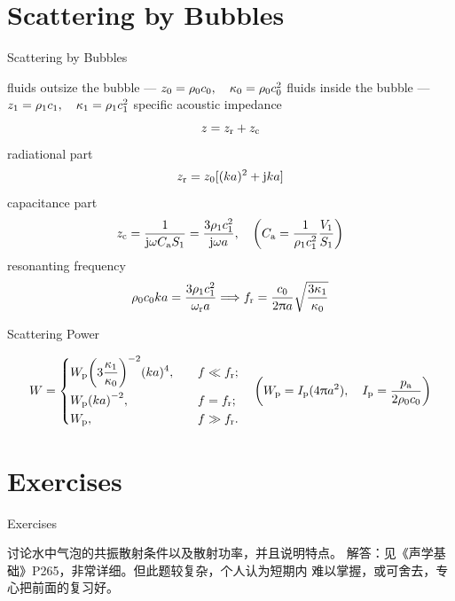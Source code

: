 \documentclass[9pt,mathserif]{beamer}
\let\emph\relax %
\begin{document}
\section{Scattering by Bubbles}
\begin{frame}{Scattering by Bubbles}
	\begin{outline}
		\1 fluids outsize the bubble --- $z_0 = \rho_0 c_0\qc \kappa_0 = 
		\rho_0c_0^2$
		\1 fluids inside the bubble --- $z_1 = \rho_1 c_1\qc \kappa_1 = 
		\rho_1c_1^2$
		\1 specific acoustic impedance
		$$z = z_\text{r} + z_\text{c}$$
		\1 radiational part
		$$z_\text{r} = z_0[(ka)^2+\mathrm{j} ka]$$
		\1 capacitance part
		$$z\st{c} = \frac{1}{\mj \omega C\st{a} S_1} = \frac{3\rho_1c_1^2}{
		\mj \omega a}\qc \qty(C\st{a} = \frac{1}{\rho_1c_1^2} \frac{V_1}{
		S_1})$$
		\1 resonanting frequency
		$$\rho_0c_0 k a = \frac{3\rho_1c_1^2}{\omega_\text{r} a}
		\Longrightarrow
		f_\text{r} = \frac{c_0}{2\uppi a}\sqrt{\frac{3\kappa_1}{\kappa_0}}$$
	\end{outline}
\end{frame}

\begin{frame}{Scattering Power}
	\begin{outline}
		$$
		W = 
		\begin{dcases}
			W\st{p} \qty(3 \frac{\kappa_1}{\kappa_0})^{-2} (ka)^4\qc 
			&f\ll f\st{r};\\
			W\st{p} \qty(ka)^{-2}\qc & f=f\st{r};\\
			W\st{p} \qc &f\gg f\st{r}.
		\end{dcases}
		\quad
		\qty(W\st{p} = I\st{p} (4\uppi a^2)\qc 
		I\st{p} = \frac{p\st{a}}{2\rho_0c_0})
		$$
	\end{outline}
\end{frame}

\section{Exercises}
\begin{frame}{Exercises}
	\begin{outline}
		\1 \emph{5.} 讨论水中气泡的共振散射条件以及散射功率，并且说明特点。
		\1 解答：见《声学基础》P265，非常详细。但此题较复杂，个人认为短期内
		难以掌握，或可舍去，专心把前面的复习好。
	\end{outline}
\end{frame}

\setcounter{framenumber}{0}
\renewcommand{\titlestring}{Viscous Absorption of Sound}
\end{document}
